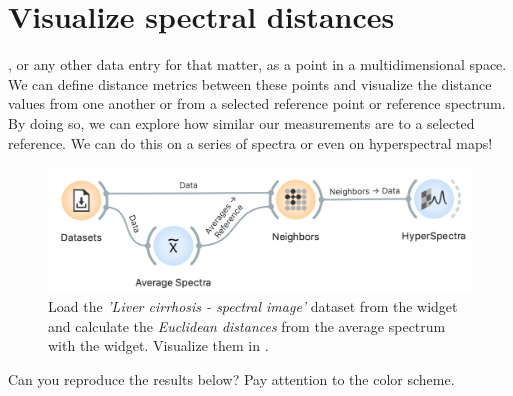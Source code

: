 \chapter{Visualize spectral distances}
\label{ch:visualize-spectral-distances}

, or any other data entry for that matter, as a point in a multidimensional space. We can define distance metrics between these points and visualize the distance values from one another or from a selected reference point or reference spectrum. By doing so, we can explore how similar our measurements are to a selected reference. We can do this on a series of spectra or even on hyperspectral maps!


\begin{figure}[h]
    \centering
	\vspace{0cm}
    \includegraphics[width=\textwidth]{workflow.png}
    \caption{Load the \textit{'Liver cirrhosis - spectral image'} dataset from the  widget and calculate the \textit{Euclidean distances} from the average spectrum with the  widget. Visualize them in .}
\end{figure}

\vspace{-0.5cm}

\noindent Can you reproduce the results below? Pay attention to the color scheme.

